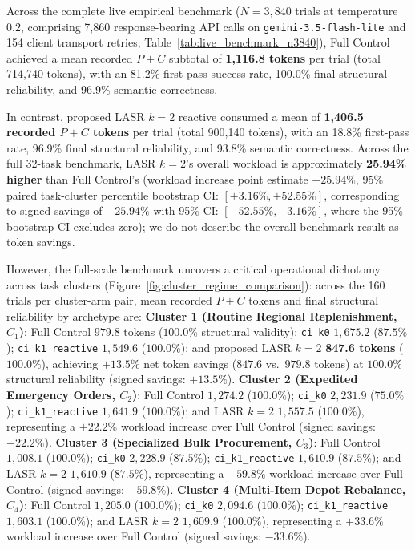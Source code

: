 Across the complete live empirical benchmark ($N=3,840$ trials at temperature $0.2$, comprising 7,860 response-bearing API calls on \texttt{gemini-3.5-flash-lite} and 154 client transport retries; Table~\ref{tab:live_benchmark_n3840}), Full Control achieved a mean recorded $P+C$ subtotal of \textbf{1,116.8 tokens} per trial (total 714,740 tokens), with an 81.2\% first-pass success rate, 100.0\% final structural reliability, and 96.9\% semantic correctness.

In contrast, proposed LASR $k=2$ reactive consumed a mean of \textbf{1,406.5 recorded $P+C$ tokens} per trial (total 900,140 tokens), with an 18.8\% first-pass rate, 96.9\% final structural reliability, and 93.8\% semantic correctness. Across the full 32-task benchmark, LASR $k=2$'s overall workload is approximately \textbf{25.94\% higher} than Full Control's (workload increase point estimate $+25.94\%$, 95\% paired task-cluster percentile bootstrap CI: $[+3.16\%, +52.55\%]$, corresponding to signed savings of $-25.94\%$ with 95\% CI: $[-52.55\%, -3.16\%]$, where the 95\% bootstrap CI excludes zero); we do not describe the overall benchmark result as token savings.

However, the full-scale benchmark uncovers a critical operational dichotomy across task clusters (Figure~\ref{fig:cluster_regime_comparison}): across the 160 trials per cluster-arm pair, mean recorded $P+C$ tokens and final structural reliability by archetype are:
\textbf{Cluster 1 (Routine Regional Replenishment, $C_1$)}: Full Control $979.8$ tokens ($100.0\%$ structural validity); \texttt{ci\_k0} $1,675.2$ ($87.5\%$); \texttt{ci\_k1\_reactive} $1,549.6$ ($100.0\%$); and proposed LASR $k=2$ \textbf{847.6 tokens} ($100.0\%$), achieving $\mathbf{+13.5\%}$ net token savings ($847.6$ vs.\ $979.8$ tokens) at $100.0\%$ structural reliability (signed savings: $+13.5\%$).
\textbf{Cluster 2 (Expedited Emergency Orders, $C_2$)}: Full Control $1,274.2$ ($100.0\%$); \texttt{ci\_k0} $2,231.9$ ($75.0\%$); \texttt{ci\_k1\_reactive} $1,641.9$ ($100.0\%$); and LASR $k=2$ $1,557.5$ ($100.0\%$), representing a $+22.2\%$ workload increase over Full Control (signed savings: $-22.2\%$).
\textbf{Cluster 3 (Specialized Bulk Procurement, $C_3$)}: Full Control $1,008.1$ ($100.0\%$); \texttt{ci\_k0} $2,228.9$ ($87.5\%$); \texttt{ci\_k1\_reactive} $1,610.9$ ($87.5\%$); and LASR $k=2$ $1,610.9$ ($87.5\%$), representing a $+59.8\%$ workload increase over Full Control (signed savings: $-59.8\%$).
\textbf{Cluster 4 (Multi-Item Depot Rebalance, $C_4$)}: Full Control $1,205.0$ ($100.0\%$); \texttt{ci\_k0} $2,094.6$ ($100.0\%$); \texttt{ci\_k1\_reactive} $1,603.1$ ($100.0\%$); and LASR $k=2$ $1,609.9$ ($100.0\%$), representing a $+33.6\%$ workload increase over Full Control (signed savings: $-33.6\%$).

